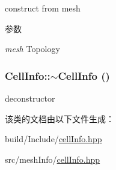 construct from mesh 
\begin{DoxyParams}{参数}
\item[{\em mesh}]Topology \end{DoxyParams}
\hypertarget{classCellInfo_aea4f621af2ea308f7ecfb4118847751e}{
\subsubsection[{$\sim$CellInfo}]{\setlength{\rightskip}{0pt plus 5cm}CellInfo::$\sim$CellInfo ()}}
\label{classCellInfo_aea4f621af2ea308f7ecfb4118847751e}


deconstructor 

该类的文档由以下文件生成：\begin{DoxyCompactItemize}
\item 
build/Include/\hyperlink{build_2Include_2cellInfo_8hpp}{cellInfo.hpp}\item 
src/meshInfo/\hyperlink{src_2meshInfo_2cellInfo_8hpp}{cellInfo.hpp}\end{DoxyCompactItemize}
